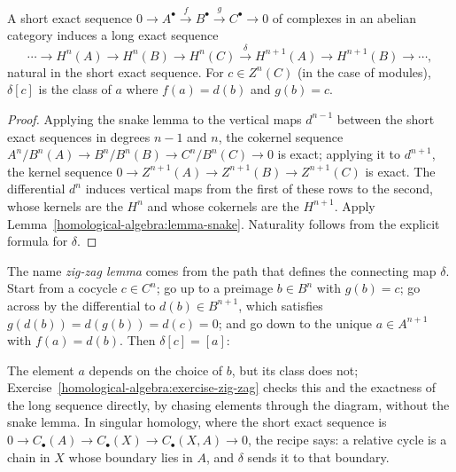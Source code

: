 \begin{theorem}\label{homological-algebra:theorem-long-exact-sequence}
A short exact sequence $0 \to A^\bullet \xrightarrow{f} B^\bullet \xrightarrow{g} C^\bullet \to 0$ of complexes in an abelian category
induces a long exact sequence
\[
\cdots \to H^n(A) \to H^n(B) \to H^n(C) \xrightarrow{\delta} H^{n+1}(A) \to H^{n+1}(B) \to \cdots,
\]
natural in the short exact sequence. For $c \in Z^n(C)$ (in the case of modules), $\delta[c]$ is the class of $a$ where
$f(a) = d(b)$ and $g(b) = c$.
\end{theorem}

\begin{proof}
Applying the snake lemma to the vertical maps $d^{n-1}$ between the short exact sequences in degrees $n - 1$ and $n$, the
cokernel sequence $A^n/B^n(A) \to B^n/B^n(B) \to C^n/B^n(C) \to 0$ is exact; applying it to $d^{n+1}$, the kernel sequence
$0 \to Z^{n+1}(A) \to Z^{n+1}(B) \to Z^{n+1}(C)$ is exact. The differential $d^n$ induces vertical maps from the first of these rows
to the second, whose kernels are the $H^n$ and whose cokernels are the $H^{n+1}$. Apply
Lemma~\ref{homological-algebra:lemma-snake}. Naturality follows from the explicit formula for $\delta$.
\end{proof}

\begin{remark}\label{homological-algebra:remark-zig-zag}
The name \emph{zig-zag lemma} comes from the path that defines the connecting map $\delta$. Start from a cocycle $c \in C^n$; go
up to a preimage $b \in B^n$ with $g(b) = c$; go across by the differential to $d(b) \in B^{n+1}$, which satisfies
$g(d(b)) = d(g(b)) = d(c) = 0$; and go down to the unique $a \in A^{n+1}$ with $f(a) = d(b)$. Then $\delta[c] = [a]$:
\begin{center}
\end{center}
The element $a$ depends on the choice of $b$, but its class does not; Exercise~\ref{homological-algebra:exercise-zig-zag} checks
this and the exactness of the long sequence directly, by chasing elements through the diagram, without the snake lemma. In
singular homology, where the short exact sequence is $0 \to C_\bullet(A) \to C_\bullet(X) \to C_\bullet(X, A) \to 0$, the recipe says:
a relative cycle is a chain in $X$ whose boundary lies in $A$, and $\delta$ sends it to that boundary.
\end{remark}

